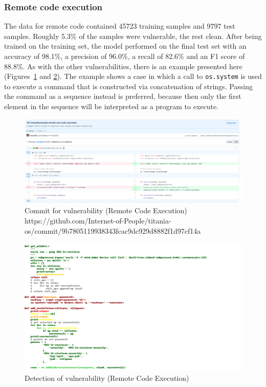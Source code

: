 \documentclass[
a4paper,
pagesize,
pdftex,
12pt,
ngerman,
fleqn,
final,
]{scrartcl}
\begin{document}
\newpage
	\subsubsection{Remote code execution}
	The data for remote code contained 45723 training samples and 9797 test samples. Roughly 5.3\% of the samples were vulnerable, the rest clean. After being trained on the training set, the model performed on the final test set with an accuracy of 98.1\%, a precision of 96.0\%, a recall of 82.6\% and an F1 score of 88.8\%. As with the other vulnerabilities, there is an example presented here (Figures~\ref{fig:remote_code_executionA} and \ref{fig:remote_code_executionAr}). The example shows a case in which a call to \texttt{os.system} is used to execute a command that is constructed via concatenation of strings. Passing the command as a sequence instead is preferred, because then only the first element in the sequence will be interpreted as a program to execute.	
	\begin{figure}[H]
		\centering
		\includegraphics[width=\linewidth]{Images/remote_code_executionA}
		\caption{Commit for vulnerability (Remote Code Execution) \newline \scriptsize{https://github.com/Internet-of-People/titania-os/commit/9b7805119938343fcac9dc929d8882f1d97cf14a}}
		\label{fig:remote_code_executionA}
	\end{figure}
	\begin{figure}[H]
		\centering
		\includegraphics[width=0.8\linewidth]{Images/remote_code_executionAr}
		\caption{Detection of vulnerability (Remote Code Execution)}
		\label{fig:remote_code_executionAr}
	\end{figure}
	
\end{document}
